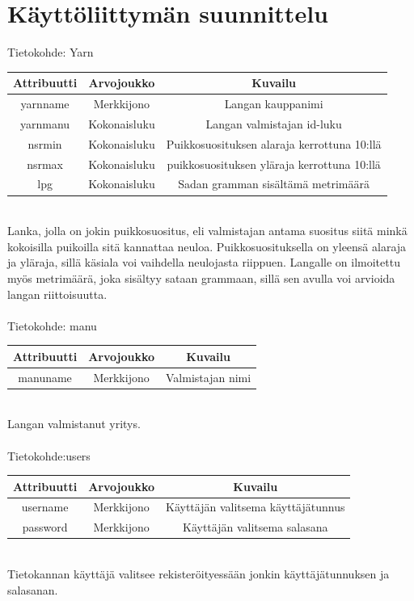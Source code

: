 \documentclass[12pt]{article}
\begin{document}
\section{Käyttöliittymän suunnittelu}
Tietokohde: Yarn\\
\begin{tabular}[H]{|c|c|c|}
\hline
Attribuutti & Arvojoukko & Kuvailu \\
\hline
yarnname & Merkkijono & Langan kauppanimi \\
\hline
yarnmanu & Kokonaisluku & Langan valmistajan id-luku\\
\hline
nsrmin & Kokonaisluku & Puikkosuosituksen alaraja kerrottuna 10:llä \\
\hline
nsrmax & Kokonaisluku & puikkosuosituksen yläraja kerrottuna 10:llä \\
\hline
lpg & Kokonaisluku & Sadan gramman sisältämä metrimäärä \\
\hline  
\end{tabular}
\\
Lanka, jolla on jokin puikkosuositus, eli valmistajan antama suositus siitä minkä kokoisilla puikoilla sitä kannattaa neuloa. Puikkosuosituksella on yleensä alaraja ja yläraja, sillä käsiala voi vaihdella neulojasta riippuen. Langalle on ilmoitettu myös metrimäärä, joka sisältyy sataan grammaan, sillä sen avulla voi arvioida langan riittoisuutta.
\ \\ \ \\
Tietokohde: manu\\
\begin{tabular}{|c|c|c|}
\hline
Attribuutti & Arvojoukko & Kuvailu \\
\hline
manuname & Merkkijono & Valmistajan nimi \\
\hline
\end{tabular}
\\
Langan valmistanut yritys.
\ \\ \ \\
Tietokohde:users\\
\begin{tabular}{|c|c|c|}
\hline
Attribuutti & Arvojoukko & Kuvailu \\
\hline
username & Merkkijono & Käyttäjän valitsema käyttäjätunnus\\
\hline
password & Merkkijono & Käyttäjän valitsema salasana\\
\hline   
\end{tabular}
\\
Tietokannan käyttäjä valitsee rekisteröityessään jonkin käyttäjätunnuksen ja salasanan. 
\end{document}
